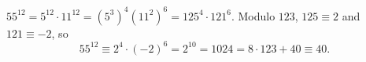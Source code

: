 $55^{12}=5^{12}\cdot11^{12}=(5^3)^4(11^2)^6=125^4\cdot121^6$. Modulo $123$, $125\equiv2$ and $121\equiv-2$, so
\[55^{12}\equiv2^4\cdot(-2)^6=2^{10}=1024=8\cdot123+40\equiv\boxed{40}.\]
